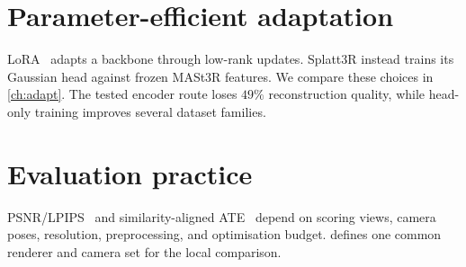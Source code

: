 \section{Parameter-efficient adaptation}
LoRA~\cite{hu2022lora} adapts a backbone through low-rank updates.
Splatt3R instead trains its Gaussian head against frozen MASt3R features.
We compare these choices in \cref{ch:adapt}. The tested encoder route loses
$49\%$ reconstruction quality, while head-only training improves several
dataset families.

\section{Evaluation practice}
PSNR/LPIPS~\cite{zhang2018lpips} and similarity-aligned
ATE~\cite{umeyama1991,grupp2017evo} depend on scoring views, camera poses,
resolution, preprocessing, and optimisation budget. 
defines one common renderer and camera set for the local comparison.
